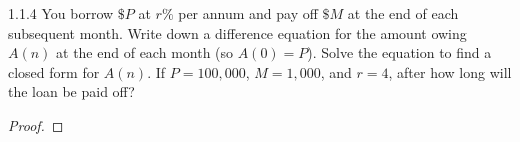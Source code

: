 \begin{problem}{1.1.4}
  You borrow $\$P$ at $r\%$ per annum
  and pay off $\$M$ at the end of each subsequent month. Write down a difference
  equation for the amount owing $A(n)$ at the end of each month (so $A(0) = P$).
  Solve the equation to find a closed form for $A(n)$. If $P = 100,000$, $M = 1,000$,
  and $r=4$, after how long will the loan be paid off?
\end{problem}

\begin{proof}
\end{proof}
\newpage
